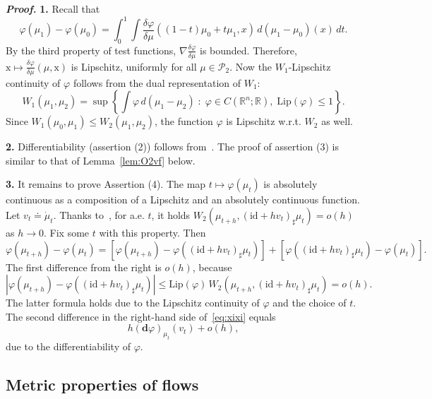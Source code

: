 \documentclass[sn-mathphys-num]{sn-jnl}
\numberwithin{equation}{section}
\theoremstyle{mythm}
\theoremstyle{mydef}
\renewenvironment{proof}{\smallskip\noindent\emph{\textbf{Proof.}}%
  \hspace{1pt}}{\hspace{-5pt}{\nobreak\quad\nobreak\hfill\nobreak%
    $\square$\vspace{2pt}\par}\smallskip\goodbreak}
\newcommand{\Lip}{\mathrm{Lip}}
\renewcommand{\phi}{\varphi}
\renewcommand{\d}{\,d}
\newcommand{\id}{\mathrm{id}}
\renewcommand{\mathbf}[1]{\bm{#1}}
\begin{document}
\begin{proof}
  \textbf{1.} Recall that 
\[
  \phi(\mu_{1}) - \phi(\mu_{0}) = \int_0^1\int \frac{\delta \phi}{\delta\mu}\left((1-t)\mu_0 + t\mu_1,x\right)\d (\mu_1-\mu_0)(x)\d t.
\]
By the third property of test functions, \( \nabla\frac{\delta \phi}{\delta \mu} \) is bounded. Therefore, \( \mathrm{x} \mapsto \frac{\delta \phi}{\delta\mu}\left(\mu,\mathrm{x}\right)  \) is Lipschitz, uniformly for all \( \mu\in \mathcal{P}_2 \).
Now the \( W_1 \)-Lipschitz continuity of \( \phi \) follows from the dual representation of \( W_1 \):
\[
  W_1(\mu_1,\mu_2) = \sup\left\{\int \phi\d(\mu_1-\mu_2)\;\colon\;\phi\in C(\mathbb{R}^n;\mathbb{R}),\;\Lip(\phi)\le 1 \right\}.
\]
Since \( W_1(\mu_0,\mu_1)\le W_2(\mu_1,\mu_2) \), the function \( \phi \) is Lipschitz w.r.t. \( W_2 \) as well.


\textbf{2.}  Differentiability (assertion (2)) follows from~\cite[Proposition 2.1]{chertovskihOptimalControlNonlocal2023}. 
  The proof of assertion (3) is similar to that of Lemma~\ref{lem:O2vf} below.

%
   \textbf{3.} It remains to prove Assertion (4). The map \( t\mapsto \phi(\mu_t) \) is absolutely continuous as a composition of a Lipschitz and an absolutely continuous function.
Let \( v_t\doteq\dot \mu_t \).
Thanks to~\cite[Proposition 8.4.6]{ambrosioGradientFlowsMetric2005}, for a.e. \( t \), it holds \( W_2(\mu_{t+h}, (\id +h v_t)_{\sharp}\mu_t) = o(h) \) as \( h\to 0 \). Fix some \( t \) with this property.
Then
\begin{equation}
\phi(\mu_{t+h}) - \phi(\mu_t) = \left[\phi(\mu_{t+h}) - \phi((\id+h v_t)_{\sharp}\mu_t)\right] + \left[\phi\left((\id+hv_t)_{\sharp}\mu_t\right) - \phi(\mu_t)\right].
  \label{eq:xixi}
\end{equation}
The first difference from the right is \( o(h) \), because
\[
\left|\phi(\mu_{t+h}) - \phi((\id+hv_t)_{\sharp}\mu_t)\right|\le \Lip(\phi)\, W_2(\mu_{t+h},(\id+hv_t)_{\sharp}\mu_t) = o(h).
\]
The latter formula holds due to the Lipschitz continuity of \( \phi \) and the choice of \( t \).
The second difference in the right-hand side of~\eqref{eq:xixi} equals
\[
h(\mathbf{d} \phi)_{\mu_t}(v_t) + o(h),
\]
due to the differentiability of \( \phi \).
\end{proof}

\subsection{Metric properties of flows}
\end{document}
